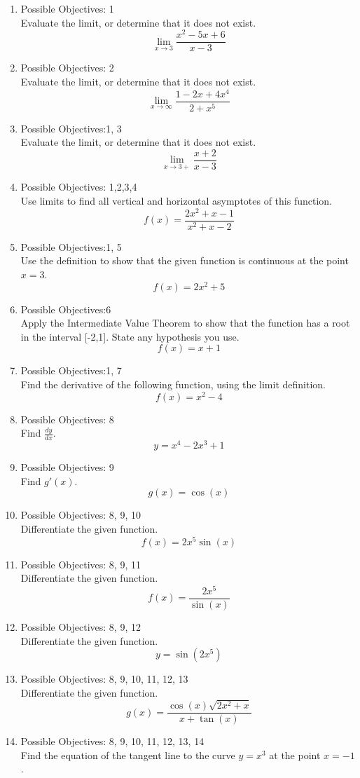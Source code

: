 \documentclass{exam}
\begin{document}
\begin{enumerate}
\item Possible Objectives: 1\\
Evaluate the limit, or determine that it does not exist.
$$\lim_{x \rightarrow 3} \frac{x^2 - 5x+6}{x-3}$$
\item Possible Objectives: 2\\
Evaluate the limit, or determine that it does not exist.
$$\lim_{x\rightarrow \infty} \frac{1-2x + 4x^4}{2 + x^5}$$
\item Possible Objectives:1, 3\\
Evaluate the limit, or determine that it does not exist.
$$\lim_{x \rightarrow 3+}  \frac{x+2}{x-3}$$
\item Possible Objectives: 1,2,3,4\\
Use limits to find all vertical and horizontal asymptotes of this function.
$$f(x) = \frac{2x^2 +x-1}{x^2 +x-2}$$
\item Possible Objectives:1, 5\\
Use the definition to show that the given function is continuous at the point $x = 3$.
$$f(x) = 2x^2 + 5$$
\item Possible Objectives:6\\
Apply the Intermediate Value Theorem to show that the function has a root in the interval [-2,1]. State any hypothesis you use.
$$f(x) = x + 1$$
\item Possible Objectives:1, 7\\
Find the derivative of the following function, using the limit definition.
$$f(x) = x^2 - 4$$
\item Possible Objectives: 8\\
Find $\frac{dy}{dx}$. $$y = x^4 - 2x^3 + 1$$
\item Possible Objectives: 9\\
Find $g'(x)$. $$g(x) = \cos(x)$$
\item Possible Objectives: 8, 9, 10\\
Differentiate the given function.
$$f(x) = 2x^5\sin(x)$$
\item Possible Objectives: 8, 9, 11\\
Differentiate the given function.
$$f(x) = \frac{2x^5}{\sin(x)}$$
\item Possible Objectives: 8, 9, 12\\ 
Differentiate the given function.
$$y = \sin(2x^5)$$
\item Possible Objectives: 8, 9, 10, 11, 12, 13\\
Differentiate the given function.
$$g(x) = \frac{\cos(x)\sqrt{2x^2 +x}}{x + \tan(x)}$$
\item Possible Objectives: 8, 9, 10, 11, 12, 13, 14\\
Find the equation of the tangent line to the curve $y = x^3$ at the point $x = -1$.
\end{enumerate}
\end{document}
